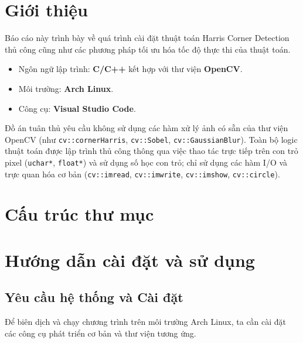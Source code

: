 \section{Giới thiệu}

Báo cáo này trình bày về quá trình cài đặt thuật toán Harris Corner Detection thủ công cũng như các phương pháp tối ưu hóa tốc độ thực thi của thuật toán.

\begin{itemize}
    \item Ngôn ngữ lập trình: \textbf{C/C++} kết hợp với thư viện \textbf{OpenCV}.
    \item Môi trường: \textbf{Arch Linux}.
    \item Công cụ: \textbf{Visual Studio Code}.
\end{itemize}

Đồ án tuân thủ yêu cầu không sử dụng các hàm xử lý ảnh có sẵn của thư viện OpenCV (như \texttt{cv::cornerHarris}, \texttt{cv::Sobel}, \texttt{cv::GaussianBlur}). Toàn bộ logic thuật toán được lập trình thủ công thông qua việc thao tác trực tiếp trên con trỏ pixel (\texttt{uchar*}, \texttt{float*}) và sử dụng số học con trỏ; chỉ sử dụng các hàm I/O và trực quan hóa cơ bản (\texttt{cv::imread}, \texttt{cv::imwrite}, \texttt{cv::imshow}, \texttt{cv::circle}).

\section{Cấu trúc thư mục}
\vspace{0.5cm}

\section{Hướng dẫn cài đặt và sử dụng}

\subsection{Yêu cầu hệ thống và Cài đặt}
Để biên dịch và chạy chương trình trên môi trường Arch Linux, ta cần cài đặt các công cụ phát triển cơ bản và thư viện tương ứng.

